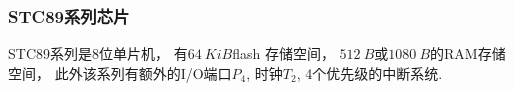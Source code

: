 \documentclass[../main.tex]{subfiles} %
\begin{document}
\subsubsection{STC89系列芯片}

STC89系列是8位单片机，
有$\SI{64}{KiB}$flash 存储空间，
$\SI{512}{B}$或$\SI{1080}{B}$的RAM存储空间，
此外该系列有额外的I/O端口$P_4$,
时钟$T_2$,
4个优先级的中断系统.
\end{document}
